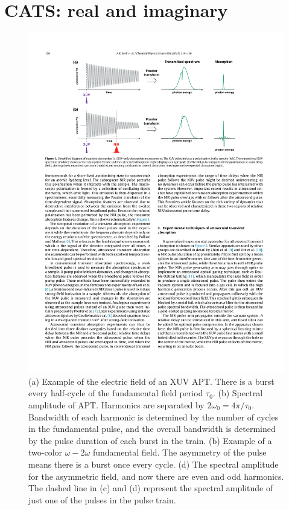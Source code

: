 \section{CATS: real and imaginary}
\label{into_theory_cats}

\begin{figure}
	\centering
	\includegraphics[width=1.0\textwidth]{figures/Introduction/gas_TA_sketch.pdf}
	\caption[Example electric field of XUV APT and its frequency spectrum]{(a) Example of the electric field of an XUV APT.  There is a burst every half-cycle of the fundamental field period $\tau_0$.  (b)  Spectral amplitude of APT.  Harmonics are separated by $2\omega_0=4\pi/\tau_0$.  Bandwidth of each harmonic is determined by the number of cycles in the fundamental pulse, and the overall bandwidth is determined by the pulse duration of each burst in the train. (b) Example of a two-color $\omega-2\omega$ fundamental field.  The asymmetry of the pulse means there is a burst once every cycle. (d) The spectral amplitude for the asymmetric field, and now there are even and odd harmonics.  The dashed line in (c) and (d) represent the spectral amplitude of just one of the pulses in the pulse train.}
	\label{fig:gas_TA_sketch}
\end{figure}

